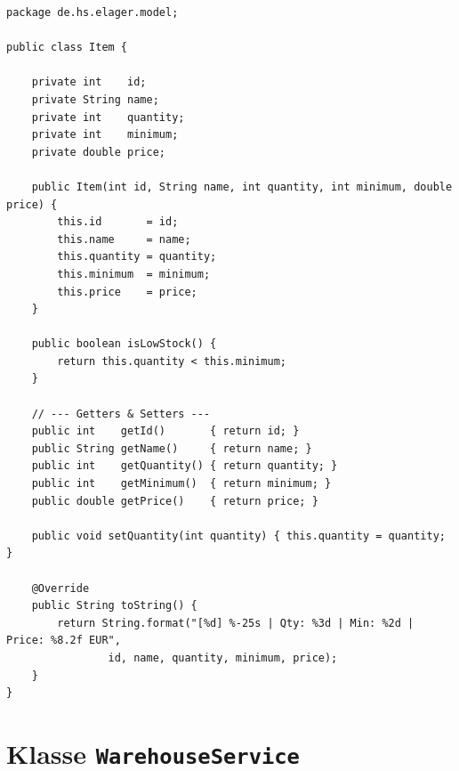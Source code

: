 \documentclass[12pt, a4paper, twoside]{report}
\begin{document}
\begin{lstlisting}[caption={Item.java -- Datenmodell eines Lagerartikels}, label={lst:item}]
package de.hs.elager.model;

public class Item {

    private int    id;
    private String name;
    private int    quantity;
    private int    minimum;
    private double price;

    public Item(int id, String name, int quantity, int minimum, double price) {
        this.id       = id;
        this.name     = name;
        this.quantity = quantity;
        this.minimum  = minimum;
        this.price    = price;
    }

    public boolean isLowStock() {
        return this.quantity < this.minimum;
    }

    // --- Getters & Setters ---
    public int    getId()       { return id; }
    public String getName()     { return name; }
    public int    getQuantity() { return quantity; }
    public int    getMinimum()  { return minimum; }
    public double getPrice()    { return price; }

    public void setQuantity(int quantity) { this.quantity = quantity; }

    @Override
    public String toString() {
        return String.format("[%d] %-25s | Qty: %3d | Min: %2d | Price: %8.2f EUR",
                id, name, quantity, minimum, price);
    }
}
\end{lstlisting}

\section{Klasse \texttt{WarehouseService}}
\end{document}
